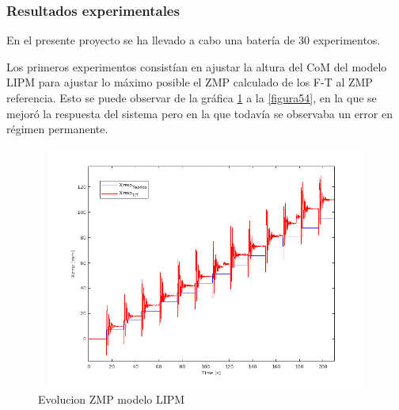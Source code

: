 \subsubsection{Resultados experimentales}

En el presente proyecto se ha llevado a cabo una batería de 30 experimentos.

Los primeros experimentos consistían en ajustar la altura del CoM del modelo LIPM para ajustar lo máximo posible el ZMP calculado de los F-T al ZMP referencia. Esto se puede observar de la gráfica \ref{figura53} a la \ref{figura54}, en la que se mejoró la respuesta del sistema pero en la que todavía se observaba un error en régimen permanente.

\begin{figure}[H]
\centering
\includegraphics[width=13cm, height=8cm]{imagenes/apartado_5/5.1/53_evolucion_zmp_lipm}
\caption{Evolucion ZMP modelo LIPM}
\label{figura53}
\end{figure}

